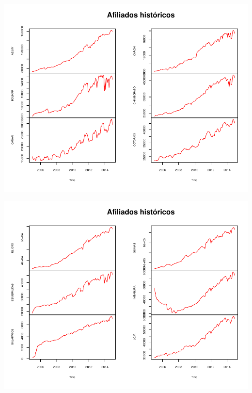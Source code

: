 \documentclass[11pt,a4paper,oneside]{article}\usepackage[]{graphicx}\usepackage[]{color}
\makeatletter
\def\maxwidth{ %
  \ifdim\Gin@nat@width>\linewidth
    \linewidth
  \else
    \Gin@nat@width
  \fi
}
\newenvironment{knitrout}{}{} %
\makeatother
\begin{document}
\begin{knitrout}
\color{fgcolor}

{\centering \includegraphics[width=\maxwidth]{figure/unnamed-chunk-1-1} 

}




{\centering \includegraphics[width=\maxwidth]{figure/unnamed-chunk-1-2} 

}





\end{knitrout}
\end{document}

